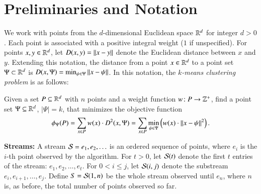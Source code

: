 \section{Preliminaries and Notation}
\label{sec:prelim}
We work with points from the $d$-dimensional Euclidean space ${\mathbb{R}}^d$ for integer
$d > 0$. Each point is associated with a positive integral weight ($1$ if
unspecified).  For points $x,y \in {\ensuremath{\mathbb{R}}}^d$, let $D(x,y) =\Arrowvert {x} - {y} \Arrowvert$ denote the
Euclidean distance between $x$ and $y$.  Extending this notation, the distance
from a point $x \in {\ensuremath{\mathbb{R}}}^d$ to a point set $\Psi \subset {\ensuremath{\mathbb{R}}}^d$ is
$D(x,\Psi) = \min_{\psi \in \Psi}\Arrowvert {x} - {\psi} \Arrowvert$.  In this notation, the
\emph{$k$-means clustering problem} is as follows:

\begin{problem} 
  Given a set $P \subseteq {\ensuremath{\mathbb{R}}}^d$ with $n$ points and a weight function
  $w\!: P \to {\ensuremath{\mathbb{Z}}}^+$, find a point set $\Psi \subseteq {\ensuremath{\mathbb{R}}}^d$, $|\Psi| = k$, that
  minimizes the objective function
\[
\phi_{\Psi}(P) = \sum_{x \in P} w(x) \cdot D^2(x,\Psi) = \sum_{x \in
  P}\min_{\psi \in \Psi} \left (w(x) \cdot {\Arrowvert {x} - {\psi} \Arrowvert}^2 \right).
\]
\end{problem}

\noindent\textbf{Streams:} A stream $\stream = e_1, e_2, \ldots$ is an ordered
sequence of points, where $e_i$ is the $i$-th point observed by the algorithm.
For $t > 0$, let $\stream(t)$ denote the first $t$ entries of the stream:
$e_1, e_2, \ldots, e_t$. For $0 < i \le j$, let $\stream(i,j)$ denote the
substream $e_i, e_{i+1}, \ldots, e_j$.
Define $S = \stream(1,n)$ be the whole stream observed until $e_n$, where $n$
is, as before, the total number of points observed so far.



